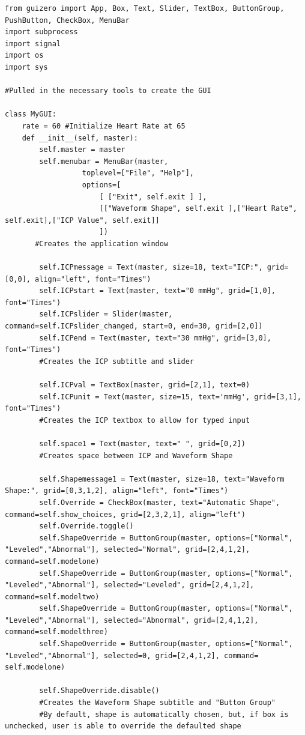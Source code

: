 \documentclass[12pt]{report}
\begin{document}
\begin{lstlisting}
from guizero import App, Box, Text, Slider, TextBox, ButtonGroup, PushButton, CheckBox, MenuBar
import subprocess
import signal
import os
import sys

#Pulled in the necessary tools to create the GUI

class MyGUI:
    rate = 60 #Initialize Heart Rate at 65 
    def __init__(self, master):
        self.master = master
        self.menubar = MenuBar(master,
                  toplevel=["File", "Help"],
                  options=[
                      [ ["Exit", self.exit ] ],
                      [["Waveform Shape", self.exit ],["Heart Rate", self.exit],["ICP Value", self.exit]]
                      ])
       #Creates the application window

        self.ICPmessage = Text(master, size=18, text="ICP:", grid=[0,0], align="left", font="Times")
        self.ICPstart = Text(master, text="0 mmHg", grid=[1,0], font="Times")
        self.ICPslider = Slider(master, command=self.ICPslider_changed, start=0, end=30, grid=[2,0])
        self.ICPend = Text(master, text="30 mmHg", grid=[3,0], font="Times")
        #Creates the ICP subtitle and slider

        self.ICPval = TextBox(master, grid=[2,1], text=0)
        self.ICPunit = Text(master, size=15, text='mmHg', grid=[3,1], font="Times")
        #Creates the ICP textbox to allow for typed input

        self.space1 = Text(master, text=" ", grid=[0,2])
        #Creates space between ICP and Waveform Shape

        self.Shapemessage1 = Text(master, size=18, text="Waveform Shape:", grid=[0,3,1,2], align="left", font="Times")
        self.Override = CheckBox(master, text="Automatic Shape", command=self.show_choices, grid=[2,3,2,1], align="left")
        self.Override.toggle()
        self.ShapeOverride = ButtonGroup(master, options=["Normal", "Leveled","Abnormal"], selected="Normal", grid=[2,4,1,2], command=self.modelone)
        self.ShapeOverride = ButtonGroup(master, options=["Normal", "Leveled","Abnormal"], selected="Leveled", grid=[2,4,1,2], command=self.modeltwo)
        self.ShapeOverride = ButtonGroup(master, options=["Normal", "Leveled","Abnormal"], selected="Abnormal", grid=[2,4,1,2], command=self.modelthree)
        self.ShapeOverride = ButtonGroup(master, options=["Normal", "Leveled","Abnormal"], selected=0, grid=[2,4,1,2], command= self.modelone)

        self.ShapeOverride.disable()
        #Creates the Waveform Shape subtitle and "Button Group"
        #By default, shape is automatically chosen, but, if box is unchecked, user is able to override the defaulted shape


\end{lstlisting}
\end{document}

